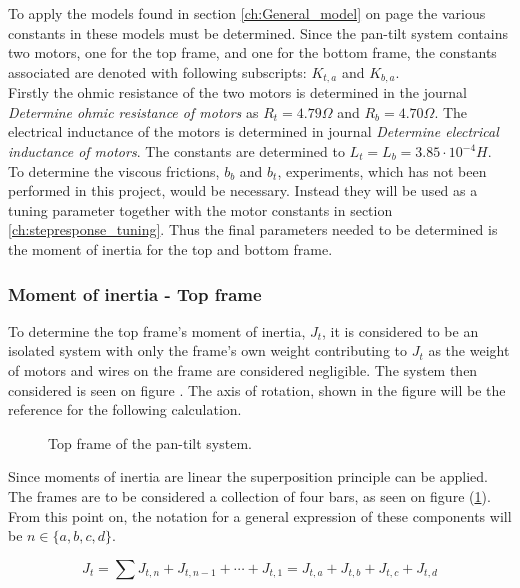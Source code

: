 \documentclass[../../main]{subfiles}
\begin{document}
To apply the models found in section \ref{ch:General_model} on page \pageref{ch:General_model} the various constants in these models must be determined. Since the pan-tilt system contains two motors, one for the top frame, and one for the bottom frame, the constants associated are denoted with following subscripts: $K_{t,a}$ and $K_{b,a}$. \\
Firstly the ohmic resistance of the two motors is determined in the journal \textit{Determine ohmic resistance of motors} as $R_t = 4.79 \si{\Omega}$ and $R_b = 4.70 \si{\Omega}$. The electrical inductance of the motors is determined  in journal \textit{Determine electrical inductance of motors}. The constants are determined to $L_t = L_b = 3.85\cdot 10^{-4} \si{H}$.
To determine the viscous frictions, $b_b$ and $b_t$, experiments, which has not been performed in this project, would be necessary. Instead they will be used as a tuning parameter together with the motor constants in section \ref{ch:stepresponse_tuning}. Thus the final parameters needed to be determined is the moment of inertia for the top and bottom frame.

\subsubsection{Moment of inertia - Top frame}
\label{sec:Top_frame_inertia}
To determine the top frame's moment of inertia, $J_{t}$, it is considered to be an isolated system with only the frame's own weight contributing to $J_{t}$ as the weight of motors and wires on the frame are considered negligible. The system then considered is seen on figure . The axis of rotation, shown in the figure  will be the reference for the following calculation.\\

\begin{figure}[H]
  \centering
  
  \caption{Top frame of the pan-tilt system.}
  \label{fig:TopFrame}
\end{figure}

Since moments of inertia are linear the superposition principle can be applied. The frames are to be considered a collection of four bars, as seen on figure (\ref{fig:TopFrame}). From this point on, the notation for a general expression of these components will be $n \in \{a,b,c,d\}$.

\begin{equation}
  \label{eq:Top_frame_total_inertia_formula}
  J_t = \sum J_{t,n} + J_{t,n-1} + \dotsb + J_{t,1} = J_{t,a} + J_{t,b} + J_{t,c} + J_{t,d}
\end{equation}
\end{document}
